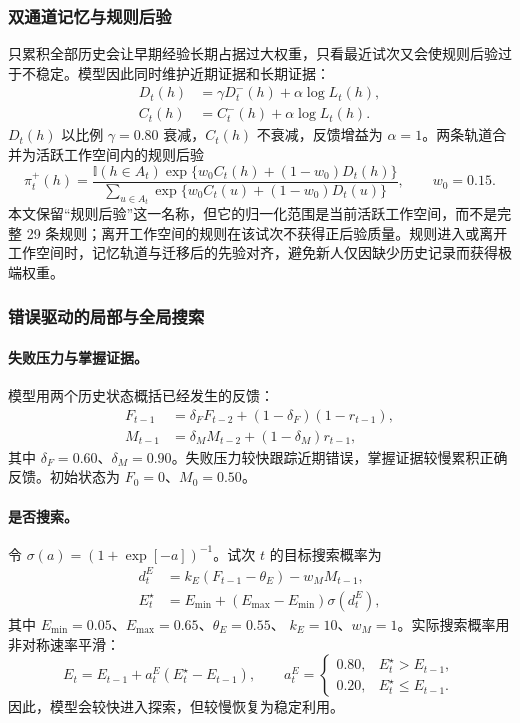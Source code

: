\subsubsection{双通道记忆与规则后验}

只累积全部历史会让早期经验长期占据过大权重，只看最近试次又会使规则后验过于不稳定。模型因此同时维护近期证据和长期证据：
\begin{align}
D_t(h)
&=\gamma D_t^{-}(h)+\alpha\log L_t(h),
\nonumber\\
C_t(h)
&=C_t^{-}(h)+\alpha\log L_t(h).
\label{eq:m0815-dual-memory}
\end{align}
$D_t(h)$ 以比例 $\gamma=0.80$ 衰减，$C_t(h)$ 不衰减，反馈增益为
$\alpha=1$。两条轨道合并为活跃工作空间内的规则后验
\begin{equation}
\pi_t^{+}(h)
=
\frac{\mathbb I(h\in A_t)
\exp\{w_0C_t(h)+(1-w_0)D_t(h)\}}
{\sum_{u\in A_t}
\exp\{w_0C_t(u)+(1-w_0)D_t(u)\}},
\qquad w_0=0.15.
\label{eq:m0815-rule-posterior}
\end{equation}
本文保留“规则后验”这一名称，但它的归一化范围是当前活跃工作空间，而不是完整 29 条规则；离开工作空间的规则在该试次不获得正后验质量。规则进入或离开工作空间时，记忆轨道与迁移后的先验对齐，避免新人仅因缺少历史记录而获得极端权重。


\subsubsection{错误驱动的局部与全局搜索}

\paragraph{失败压力与掌握证据。}
模型用两个历史状态概括已经发生的反馈：
\begin{align}
F_{t-1}
&=\delta_FF_{t-2}+(1-\delta_F)(1-r_{t-1}),
\nonumber\\
M_{t-1}
&=\delta_MM_{t-2}+(1-\delta_M)r_{t-1},
\label{eq:m0815-failure-mastery}
\end{align}
其中 $\delta_F=0.60$、$\delta_M=0.90$。失败压力较快跟踪近期错误，掌握证据较慢累积正确反馈。初始状态为 $F_0=0$、$M_0=0.50$。

\paragraph{是否搜索。}
令 $\sigma(a)=(1+\exp[-a])^{-1}$。试次 $t$ 的目标搜索概率为
\begin{align}
d_t^E
&=k_E(F_{t-1}-\theta_E)-w_MM_{t-1},
\nonumber\\
E_t^{\star}
&=E_{\min}+(E_{\max}-E_{\min})\sigma(d_t^E),
\label{eq:m0815-exploration-target}
\end{align}
其中 $E_{\min}=0.05$、$E_{\max}=0.65$、$\theta_E=0.55$、
$k_E=10$、$w_M=1$。实际搜索概率用非对称速率平滑：
\begin{equation}
E_t=E_{t-1}+a_t^E(E_t^{\star}-E_{t-1}),
\qquad
a_t^E=
\begin{cases}
0.80,&E_t^{\star}>E_{t-1},\\
0.20,&E_t^{\star}\leq E_{t-1}.
\end{cases}
\label{eq:m0815-exploration-smoothing}
\end{equation}
因此，模型会较快进入探索，但较慢恢复为稳定利用。

